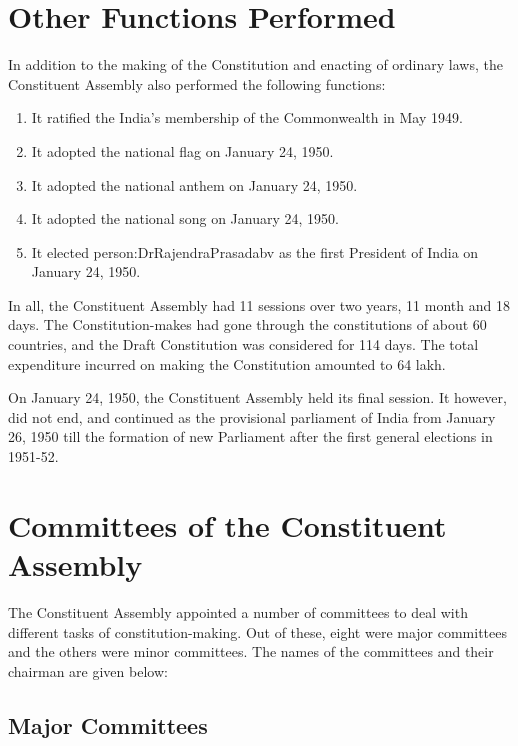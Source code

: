 \section{Other Functions Performed}

In addition to the making of the Constitution and enacting of ordinary laws, the Constituent Assembly also performed the following functions:

\begin{enumerate}
  \item It ratified the India's membership of the Commonwealth in May 1949.
  \item It adopted the national flag on January 24, 1950.
  \item It adopted the national anthem on January 24, 1950.
  \item It adopted the national song on January 24, 1950.
  \item It elected \gls{person:DrRajendraPrasadabv} as the first President of India on January 24, 1950.
\end{enumerate}

In all, the Constituent Assembly had 11 sessions over two years, 11 month and 18 days. The Constitution-makes had gone through the constitutions of about 60 countries, and the Draft Constitution was considered for 114 days. The total expenditure incurred on making the Constitution amounted to 64 lakh.

On January 24, 1950, the Constituent Assembly held its final session. It however, did not end, and continued as the provisional parliament of India from January 26, 1950 till the formation of new Parliament after the first general elections in 1951-52.

\section{Committees of the Constituent Assembly}

The Constituent Assembly appointed a number of committees to deal with different tasks of constitution-making. Out of these, eight were major committees and the others were minor committees. The names of the committees and their chairman are given below:

\subsection{Major Committees}

